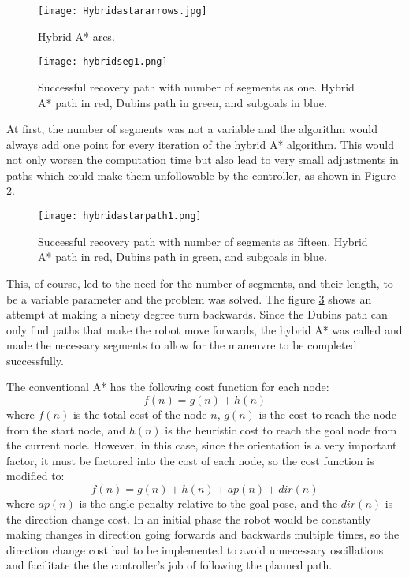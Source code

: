 \begin{figure}[h]
    \centering
    \texttt{[image: Hybridastararrows.jpg]}
    \caption{Hybrid A* arcs.}
    \label{fig:arrows}
\end{figure}

\begin{figure}[h]
    \centering
    \texttt{[image: hybridseg1.png]}
    \caption{Successful recovery path with number of segments as one. Hybrid A* path in red, Dubins path in green, and subgoals in blue.}
    \label{fig:rseg1}
\end{figure}

At first, the number of segments was not a variable and the algorithm would always add 
one point for every iteration of the hybrid A* algorithm. This would not only worsen the computation 
time but also lead to very small adjustments in paths which could make them unfollowable by the controller, 
as shown in Figure \ref{fig:rseg1}.



\begin{figure}[h]
    \centering
    \texttt{[image: hybridastarpath1.png]}
    \caption{Successful recovery path with number of segments as fifteen. Hybrid A* path in red, Dubins path in green, and subgoals in blue.}
    \label{fig:recovery_module}
\end{figure}

This, of course, led to the need for the number of segments, and their length, to be a variable 
parameter and the problem was solved. The figure \ref{fig:recovery_module} shows an attempt at 
making a ninety degree turn backwards. Since the Dubins path can only find paths that make the robot move 
forwards, the hybrid A* was called and made the necessary segments to allow for the maneuvre 
to be completed successfully.

The conventional A* has the following cost function for each node:
$$f(n) = g(n) + h(n)$$
where $f(n)$ is the total cost of the node $n$, $g(n)$ is the cost to reach the node from the start node, 
and $h(n)$ is the heuristic cost to reach the goal node from the current node. However, 
in this case, since the orientation is a very important factor, it must be factored 
into the cost of each node, so the cost function is modified to:
$$f(n) = g(n) + h(n) + ap(n) + dir(n)$$
where $ap(n)$ is the angle penalty relative to the goal pose, and the $dir(n)$ 
is the direction change cost. In an initial phase the robot would be constantly making 
changes in direction going forwards and backwards multiple times, so the direction 
change cost had to be implemented to avoid unnecessary oscillations and facilitate the 
the controller's job of following the planned path.

